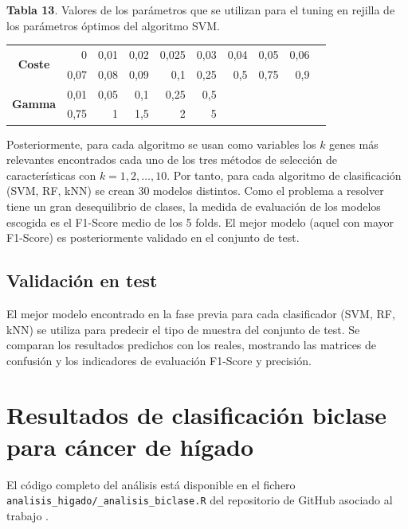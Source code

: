 \textbf{Tabla 13}. Valores de los parámetros que se utilizan para el tuning en rejilla de los parámetros óptimos del algoritmo SVM.

\begin{table}[H]
	\centering
	\begin{tabular}{crrrrrrrrr}
		\hline
		\multirow{2}{*}{\textbf{Coste}} & 0    & 0,01 & 0,02         & 0,025                             & 0,03 & 0,04 & 0,05 & 0,06 \\
		& 0,07 & 0,08 & 0,09         & 0,1                               & 0,25 & 0,5  & 0,75 & 0,9  \\ \hline
		\multirow{2}{*}{\textbf{Gamma}} & 0,01 & 0,05 & 0,1 & 0,25 & 0,5  &      &      &      \\
		& 0,75 & 1    & 1,5          & 2                                 & 5    &      &      &      \\ \hline
	\end{tabular}
\end{table}

Posteriormente, para cada algoritmo se usan como variables los $k$ genes más relevantes encontrados cada uno de los tres métodos de selección de características con $k = 1, 2, \hdots, 10$. Por tanto, para cada algoritmo de clasificación (SVM, RF, kNN) se crean 30 modelos distintos. Como el problema a resolver tiene un gran desequilibrio de clases, la medida de evaluación de los modelos escogida es el F1-Score medio de los 5 folds. El mejor modelo (aquel con mayor F1-Score) es posteriormente validado en el conjunto de test.

\subsection{Validación en test}

El mejor modelo encontrado en la fase previa para cada clasificador (SVM, RF, kNN) se utiliza para predecir el tipo de muestra del conjunto de test. Se comparan los resultados predichos con los reales, mostrando las matrices de confusión y los indicadores de evaluación F1-Score y precisión.

\section{Resultados de clasificación biclase para cáncer de hígado}

El código completo del análisis está disponible en el fichero \texttt{analisis\_higado/\_analisis\_biclase.R} del repositorio de GitHub asociado al trabajo \cite{Redondo-Sanchez2020}.

